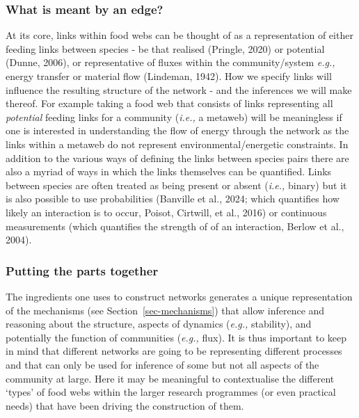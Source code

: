 \documentclass[
]{article}
\begin{document}
\subsubsection{What is meant by an
edge?}\label{what-is-meant-by-an-edge}

At its core, links within food webs can be thought of as a
representation of either feeding links between species - be that
realised (Pringle, 2020) or potential (Dunne, 2006), or representative
of fluxes within the community/system \emph{e.g.,} energy transfer or
material flow (Lindeman, 1942). How we specify links will influence the
resulting structure of the network - and the inferences we will make
thereof. For example taking a food web that consists of links
representing all \emph{potential} feeding links for a community
(\emph{i.e.,} a metaweb) will be meaningless if one is interested in
understanding the flow of energy through the network as the links within
a metaweb do not represent environmental/energetic constraints. In
addition to the various ways of defining the links between species pairs
there are also a myriad of ways in which the links themselves can be
quantified. Links between species are often treated as being present or
absent (\emph{i.e.,} binary) but it is also possible to use
probabilities (Banville et al., 2024; which quantifies how likely an
interaction is to occur, Poisot, Cirtwill, et al., 2016) or continuous
measurements (which quantifies the strength of of an interaction, Berlow
et al., 2004).

\subsubsection{Putting the parts
together}\label{putting-the-parts-together}

The ingredients one uses to construct networks generates a unique
representation of the mechanisms (see Section~\ref{sec-mechanisms}) that
allow inference and reasoning about the structure, aspects of dynamics
(\emph{e.g.,} stability), and potentially the function of communities
(\emph{e.g.,} flux). It is thus important to keep in mind that different
networks are going to be representing different processes and that can
only be used for inference of some but not all aspects of the community
at large. Here it may be meaningful to contextualise the different
`types' of food webs within the larger research programmes (or even
practical needs) that have been driving the construction of them.
\end{document}
